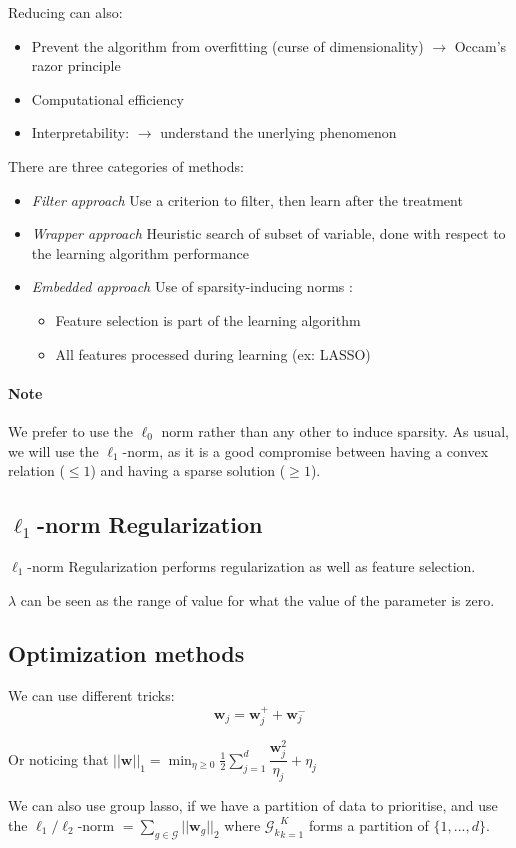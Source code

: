 \documentclass{article}
\begin{document}
Reducing can also:
\begin{itemize}
\item Prevent the algorithm from overfitting (curse of dimensionality) $\to$ Occam's razor principle
\item Computational efficiency
\item Interpretability: $\to$ understand the unerlying phenomenon
\end{itemize}


There are three categories of methods:
\begin{itemize}
\item \emph{Filter approach} Use a criterion to filter, then learn after the treatment
\item \emph{Wrapper approach} Heuristic search of subset of variable, done with respect to the learning algorithm performance
\item \emph{Embedded approach} Use of sparsity-inducing norms :
\begin{itemize}
\item Feature selection is part of the learning algorithm
\item All features processed during learning (ex: LASSO)
\end{itemize}
\end{itemize}

\paragraph{Note}
We prefer to use the $\ell_0$ norm rather than any other to induce sparsity. As usual, we will use the $\ell_1$-norm, as it is a good compromise between having a convex relation ($\leq 1$) and having a sparse solution ($\geq 1$).

\subsection{$\ell_1$-norm Regularization}
$\ell_1$-norm Regularization performs regularization as well as feature selection.

$\lambda$ can be seen as the range of value for what the value of the parameter is zero.


\subsection{Optimization methods}
We can use different tricks:
\[\mathbf{w}_j = \mathbf{w}_j^+ + \mathbf{w}_j^-\]

Or noticing that $||\mathbf{w}||_1=\min_{\eta \geq 0}\frac{1}{2} \sum_{j=1}^d \dfrac{\mathbf{w}_j^2}{\eta_j}+\eta_j $

We can also use group lasso, if we have a partition of data to prioritise, and use the $\ell_1/\ell_2$-norm $ = \sum_{g\in \mathcal{G}} || \mathbf{w}_g||_2$ where ${\mathcal{G}_k}_{k=1}^K$ forms a partition of $\{1,...,d\}$.
\end{document}
